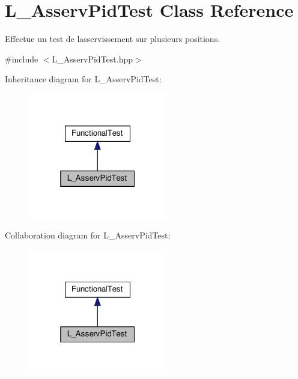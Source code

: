 \hypertarget{classL__AsservPidTest}{}\section{L\+\_\+\+Asserv\+Pid\+Test Class Reference}
\label{classL__AsservPidTest}


Effectue un test de l\textquotesingle{}asservissement sur plusieurs positions.  




{\ttfamily \#include $<$L\+\_\+\+Asserv\+Pid\+Test.\+hpp$>$}



Inheritance diagram for L\+\_\+\+Asserv\+Pid\+Test\+:
\nopagebreak
\begin{figure}[H]
\begin{center}
\leavevmode
\includegraphics[width=172pt]{classL__AsservPidTest__inherit__graph}
\end{center}
\end{figure}


Collaboration diagram for L\+\_\+\+Asserv\+Pid\+Test\+:
\nopagebreak
\begin{figure}[H]
\begin{center}
\leavevmode
\includegraphics[width=172pt]{classL__AsservPidTest__coll__graph}
\end{center}
\end{figure}
